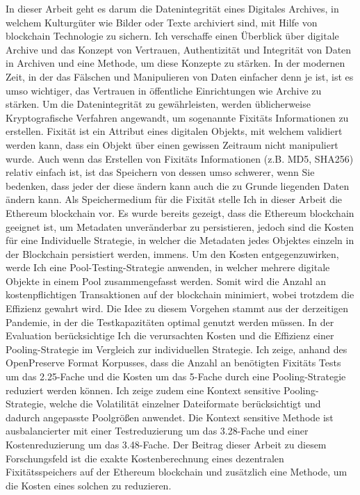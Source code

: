 In dieser Arbeit geht es darum die Datenintegrität eines Digitales Archives, in welchem Kulturgüter wie Bilder oder Texte archiviert sind, mit Hilfe von blockchain Technologie zu sichern. Ich verschaffe einen Überblick über digitale Archive und das Konzept von Vertrauen, Authentizität und Integrität von Daten in Archiven und eine Methode, um diese Konzepte zu stärken. In der modernen Zeit, in der das Fälschen und Manipulieren von Daten einfacher denn je ist, ist es umso wichtiger, das Vertrauen in öffentliche Einrichtungen wie Archive zu stärken.
Um die Datenintegrität zu gewährleisten, werden üblicherweise Kryptografische Verfahren angewandt, um sogenannte Fixitäts Informationen zu erstellen. Fixität ist ein Attribut eines digitalen Objekts, mit welchem validiert werden kann, dass ein Objekt über einen gewissen Zeitraum nicht manipuliert wurde. Auch wenn das Erstellen von Fixitäts Informationen (z.B. MD5, SHA256) relativ einfach ist, ist das Speichern von dessen umso schwerer, wenn Sie bedenken, dass jeder der diese ändern kann auch die zu Grunde liegenden Daten ändern kann.
Als Speichermedium für die Fixität stelle Ich in dieser Arbeit die Ethereum blockchain vor. Es wurde bereits gezeigt, dass die Ethereum blockchain geeignet ist, um Metadaten unveränderbar zu persistieren, jedoch sind die Kosten für eine Individuelle Strategie, in welcher die Metadaten jedes Objektes einzeln in der Blockchain persistiert werden, immens.
Um den Kosten entgegenzuwirken, werde Ich eine Pool-Testing-Strategie anwenden, in welcher mehrere digitale Objekte in einem Pool zusammengefasst werden. Somit wird die Anzahl an kostenpflichtigen Transaktionen auf der blockchain minimiert, wobei trotzdem die Effizienz gewahrt wird. Die Idee zu diesem Vorgehen stammt aus der derzeitigen Pandemie, in der die Testkapazitäten optimal genutzt werden müssen.
In der Evaluation berücksichtige Ich die verursachten Kosten und die Effizienz einer Pooling-Strategie im Vergleich zur individuellen Strategie. Ich zeige, anhand des OpenPreserve Format Korpusses, dass die Anzahl an benötigten Fixitäts Tests um das 2.25-Fache und die Kosten um das 5-Fache durch eine Pooling-Strategie reduziert werden können. Ich zeige zudem eine Kontext sensitive Pooling-Strategie, welche die Volatilität einzelner Dateiformate berücksichtigt und dadurch angepasste Poolgrößen anwendet. Die Kontext sensitive Methode ist ausbalancierter mit einer Testreduzierung um das 3.28-Fache und einer Kostenreduzierung um das 3.48-Fache.
Der Beitrag dieser Arbeit zu diesem Forschungsfeld ist die exakte Kostenberechnung eines dezentralen Fixitätsspeichers auf der Ethereum blockchain und zusätzlich eine Methode, um die Kosten eines solchen zu reduzieren.

